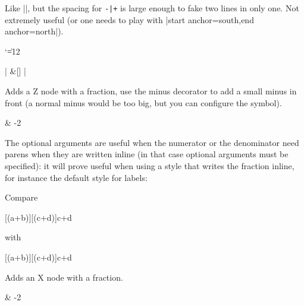 \documentclass[a4paper,doc2]{ltxdoc} %
\begin{document}
{\begin{command}{\zxNoneDouble\opt{-\textbar+}}
  Like |\zxNone|, but the spacing for \verb#-|+# is large enough to fake two lines in only one. Not extremely useful (or one needs to play with |start anchor=south,end anchor=north|).
{\catcode`\|=12 %
\begin{codeexample}[width=3cm]
\begin{ZX}
  \zxNoneDouble|{} \ar[r,s,start anchor=north,end anchor=south] \ar[r,s,start anchor=south,end anchor=north] &[\zxWCol] \zxNoneDouble|{}
\end{ZX}
\end{codeexample}
}
\end{command}

\begin{command}{\zxFracZ\opt{-}}
  Adds a Z node with a fraction, use the minus decorator to add a small minus in front (a normal minus would be too big, but you can configure the symbol).
\begin{codeexample}[width=3cm]
\begin{ZX}
   & \zxFracZ-{\pi}{2}
\end{ZX}
\end{codeexample}
The optional arguments are useful when the numerator or the denominator need parens when they are written inline (in that case optional arguments must be specified): it will prove useful when using a style that writes the fraction inline, for instance the default style for labels:
\begin{codeexample}[]
Compare %
\begin{ZX}
  [(a+b)][(c+d)]{c+d}
\end{ZX} with %
\begin{ZX}
  [(a+b)][(c+d)]{c+d}
\end{ZX}
\end{codeexample}
\end{command}

\begin{command}{\zxFracX\opt{-}}
  Adds an X node with a fraction.
\begin{codeexample}[width=3cm]
\begin{ZX}
   & \zxFracX-{\pi}{2}
\end{ZX}
\end{codeexample}
\end{command}

}
\end{document}
